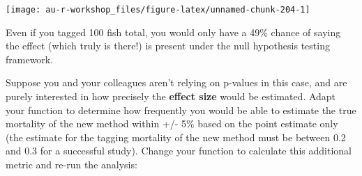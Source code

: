 \documentclass[]{book}
\begin{document}
\begin{center}\texttt{[image: au-r-workshop\_files/figure-latex/unnamed-chunk-204-1]} \end{center}

Even if you tagged 100 fish total, you would only have a 49\% chance of saying the effect (which truly is there!) is present under the null hypothesis testing framework.

Suppose you and your colleagues aren't relying on p-values in this case, and are purely interested in how precisely the \textbf{effect size} would be estimated. Adapt your function to determine how frequently you would be able to estimate the true mortality of the new method within +/- 5\% based on the point estimate only (the estimate for the tagging mortality of the new method must be between 0.2 and 0.3 for a successful study). Change your function to calculate this additional metric and re-run the analysis:
\end{document}
